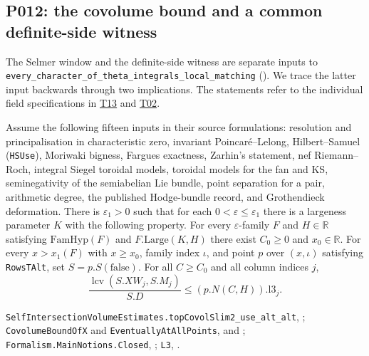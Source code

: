 \subsection{P012: the covolume bound and a common definite-side witness}
\label{sec:r23-p012}

The Selmer window and the definite-side witness are separate inputs to
\nolinkurl{every_character_of_theta_integrals_local_matching}
().
We trace the latter input backwards through two implications. The statements
refer to the individual field specifications in \hyperref[sub:T13]{T13}
and \hyperref[sub:T02]{T02}.

\begin{formalstatement}
Assume the following fifteen inputs in their source formulations:
resolution and principalisation in characteristic zero, invariant
Poincaré--Lelong, Hilbert--Samuel (\nolinkurl{HSUse}), Moriwaki bigness,
Fargues exactness, Zarhin's statement, nef Riemann--Roch, integral
Siegel toroidal models, toroidal models for the fan and KS,
seminegativity of the semiabelian Lie bundle, point separation for a
pair, arithmetic degree, the published Hodge-bundle record, and
Grothendieck deformation. There is $\varepsilon_1>0$ such that for
each $0<\varepsilon\le\varepsilon_1$ there is a largeness parameter $K$
with the following property. For every $\varepsilon$-family $F$ and
$H\in\mathbb R$ satisfying $\mathrm{FamHyp}(F)$ and
$F.\mathrm{Large}(K,H)$ there exist $C_0\ge0$ and $x_0\in\mathbb R$.
For every $x>x_1(F)$ with $x\ge x_0$, family index $\iota$, and point
$p$ over $(x,\iota)$ satisfying \nolinkurl{RowsTAlt}, set $S=p.S(\mathrm{false})$.
For all $C\ge C_0$ and all column indices $j$,
\[
   \frac{\operatorname{lcv}(S.XW_j,S.M_j)}{S.D}
      \le (p.N(C,H)).\mathrm{l3}_j .
\]
\end{formalstatement}
\noindent\nolinkurl{SelfIntersectionVolumeEstimates.topCovolSlim2_use_alt_alt},
;
\nolinkurl{CovolumeBoundOfX} and \nolinkurl{EventuallyAtAllPoints},
 and ;
\nolinkurl{Formalism.MainNotions.Closed}, ; \nolinkurl{L3},
.

